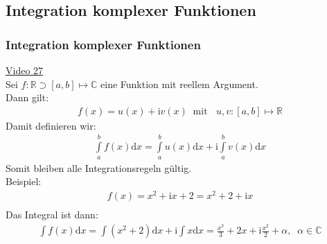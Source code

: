 \subsection{Integration komplexer Funktionen}
\subsubsection{Integration komplexer Funktionen}
\href{https://youtu.be/ms9HZdijOKI}{Video 27}\\
Sei $ f:\mathbb{R}\supset[a,b ] \longmapsto \mathbb{C}$ eine Funktion mit reellem Argument.\\
Dann gilt:\\
\begin{align*}
f(x)=u(x)+\mathrm{i}v(x)\;\;\text{mit }\;\;u,v:[a,b]\longmapsto \mathbb{R}
\end{align*}
Damit definieren wir:\\
\begin{align*}
\int\limits_{a}^{b} f(x)\mathrm{d}x=\int\limits_{a}^{b}u(x) \mathrm{d}x+\mathrm{i}\int\limits_{a}^{b} v(x)\mathrm{d}x
\end{align*}
Somit bleiben alle Integrationsregeln gültig.\\
Beispiel:\\
\begin{align*}
f(x)=x^2+\mathrm{i}x+2=x^2+2+\mathrm{i}x\\
\end{align*}
Das Integral ist dann:\\
\begin{align*}
\int\limits_{}^{} f(x)\mathrm{d}x=\int\limits_{}^{} (x^2+2)\mathrm{d}x+\mathrm{i}\int\limits_{}^{} x\mathrm{d}x=\frac{x^3}{3}+2x+\mathrm{i}\frac{x^2}{2}+\alpha,\;\;\alpha\in \mathbb{C}
\end{align*}

